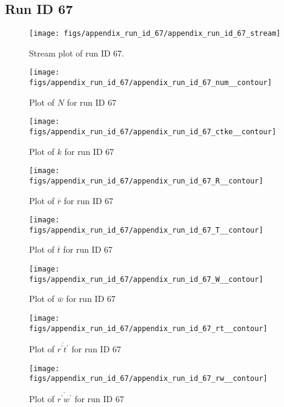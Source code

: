 \subsection{Run ID 67}
\begin{figure}[H]
\centering
\texttt{[image: figs/appendix\_run\_id\_67/appendix\_run\_id\_67\_stream]}
\caption{Stream plot of run ID 67.}
\label{fig:appendix_run_id_67_stream}
\end{figure}


\begin{figure}[H]
\centering
\texttt{[image: figs/appendix\_run\_id\_67/appendix\_run\_id\_67\_num\_\_contour]}
\caption{Plot of $N$ for run ID 67}
\label{fig:appendix_run_id_67_num__contour}
\end{figure}


\begin{figure}[H]
\centering
\texttt{[image: figs/appendix\_run\_id\_67/appendix\_run\_id\_67\_ctke\_\_contour]}
\caption{Plot of $k$ for run ID 67}
\label{fig:appendix_run_id_67_ctke__contour}
\end{figure}


\begin{figure}[H]
\centering
\texttt{[image: figs/appendix\_run\_id\_67/appendix\_run\_id\_67\_R\_\_contour]}
\caption{Plot of $\overline{r}$ for run ID 67}
\label{fig:appendix_run_id_67_R__contour}
\end{figure}


\begin{figure}[H]
\centering
\texttt{[image: figs/appendix\_run\_id\_67/appendix\_run\_id\_67\_T\_\_contour]}
\caption{Plot of $\overline{t}$ for run ID 67}
\label{fig:appendix_run_id_67_T__contour}
\end{figure}


\begin{figure}[H]
\centering
\texttt{[image: figs/appendix\_run\_id\_67/appendix\_run\_id\_67\_W\_\_contour]}
\caption{Plot of $\overline{w}$ for run ID 67}
\label{fig:appendix_run_id_67_W__contour}
\end{figure}


\begin{figure}[H]
\centering
\texttt{[image: figs/appendix\_run\_id\_67/appendix\_run\_id\_67\_rt\_\_contour]}
\caption{Plot of $\overline{r^\prime t^\prime}$ for run ID 67}
\label{fig:appendix_run_id_67_rt__contour}
\end{figure}


\begin{figure}[H]
\centering
\texttt{[image: figs/appendix\_run\_id\_67/appendix\_run\_id\_67\_rw\_\_contour]}
\caption{Plot of $\overline{r^\prime w^\prime}$ for run ID 67}
\label{fig:appendix_run_id_67_rw__contour}
\end{figure}


